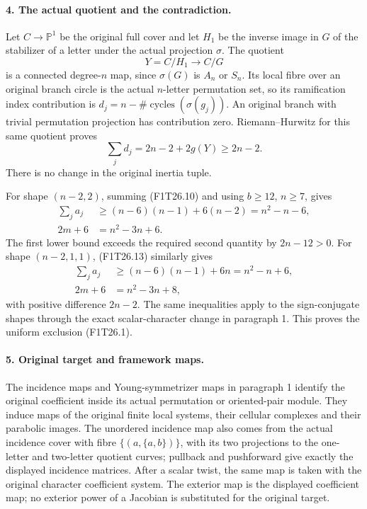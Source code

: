 \paragraph{4. The actual quotient and the contradiction.}
Let $C\to\mathbb P^1$ be the original full cover and
let $H_1$ be the inverse image in $G$ of the stabilizer
of a letter under the actual projection $\sigma$.
The quotient
\[
                         Y=C/H_1\longrightarrow C/G
 \tag{F1T26.14}
\]
is a connected degree-$n$ map, since $\sigma(G)$ is
$A_n$ or $S_n$. Its local fibre over an original
branch circle is the actual $n$-letter permutation
set, so its ramification index contribution is
$d_j=n-\#\operatorname{cycles}(\sigma(g_j))$.
An original branch with trivial permutation projection
has contribution zero. Riemann--Hurwitz for this same
quotient proves
\[
                         \sum_j d_j=2n-2+2g(Y)\ge2n-2.
 \tag{F1T26.15}
\]
There is no change in the original inertia tuple.

For shape $(n-2,2)$, summing (F1T26.10) and using
$b\ge12$, $n\ge7$, gives
\[
 \begin{split}
 \sum_j a_j
   &\ge(n-6)(n-1)+6(n-2)=n^2-n-6,\\
 2m+6&=n^2-3n+6.
 \end{split}
\]
The first lower bound exceeds the required second
quantity by $2n-12>0$. For shape $(n-2,1,1)$,
(F1T26.13) similarly gives
\[
 \begin{split}
 \sum_j a_j
   &\ge(n-6)(n-1)+6n=n^2-n+6,\\
 2m+6&=n^2-3n+8,
 \end{split}
\]
with positive difference $2n-2$. The same inequalities
apply to the sign-conjugate shapes through the exact
scalar-character change in paragraph 1. This proves
the uniform exclusion (F1T26.1).

\paragraph{5. Original target and framework maps.}
The incidence maps and Young-symmetrizer maps in paragraph
1 identify the original coefficient inside its actual
permutation or oriented-pair module. They induce maps
of the original finite local systems, their cellular
complexes and their parabolic images. The unordered
incidence map also comes from the actual incidence
cover with fibre $\{(a,\{a,b\})\}$, with its two
projections to the one-letter and two-letter quotient
curves; pullback and pushforward give exactly the
displayed incidence matrices. After a scalar twist,
the same map is taken with the original character
coefficient system. The exterior map is the displayed
coefficient map; no exterior power of a Jacobian is
substituted for the original target.

